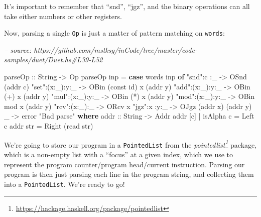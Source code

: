 \documentclass[]{article}
\newenvironment{Shaded}{}{}
\newcommand{\CommentTok}[1]{\textcolor[rgb]{0.38,0.63,0.69}{\textit{#1}}}
\newcommand{\DataTypeTok}[1]{\textcolor[rgb]{0.56,0.13,0.00}{#1}}
\newcommand{\FunctionTok}[1]{\textcolor[rgb]{0.02,0.16,0.49}{#1}}
\newcommand{\KeywordTok}[1]{\textcolor[rgb]{0.00,0.44,0.13}{\textbf{#1}}}
\newcommand{\NormalTok}[1]{#1}
\newcommand{\OtherTok}[1]{\textcolor[rgb]{0.00,0.44,0.13}{#1}}
\newcommand{\StringTok}[1]{\textcolor[rgb]{0.25,0.44,0.63}{#1}}
\renewcommand{\href}[2]{#2\footnote{\url{#1}}}
\begin{document}
It's important to remember that ``snd'', ``jgz'', and the binary operations can
all take either numbers or other registers.

Now, parsing a single \texttt{Op} is just a matter of pattern matching on
\texttt{words}:

\begin{Shaded}
\begin{Highlighting}[]
\CommentTok{-- source: https://github.com/mstksg/inCode/tree/master/code-samples/duet/Duet.hs#L39-L52}

\OtherTok{parseOp ::} \DataTypeTok{String} \OtherTok{->} \DataTypeTok{Op}
\NormalTok{parseOp inp }\FunctionTok{=} \KeywordTok{case}\NormalTok{ words inp }\KeywordTok{of}
    \StringTok{"snd"}\FunctionTok{:}\NormalTok{c    }\FunctionTok{:}\NormalTok{_   }\OtherTok{->} \DataTypeTok{OSnd}\NormalTok{ (addr c)}
    \StringTok{"set"}\FunctionTok{:}\NormalTok{(x}\FunctionTok{:}\NormalTok{_)}\FunctionTok{:}\NormalTok{y}\FunctionTok{:}\NormalTok{_ }\OtherTok{->} \DataTypeTok{OBin}\NormalTok{ (const id) x (addr y)}
    \StringTok{"add"}\FunctionTok{:}\NormalTok{(x}\FunctionTok{:}\NormalTok{_)}\FunctionTok{:}\NormalTok{y}\FunctionTok{:}\NormalTok{_ }\OtherTok{->} \DataTypeTok{OBin}\NormalTok{ (}\FunctionTok{+}\NormalTok{)        x (addr y)}
    \StringTok{"mul"}\FunctionTok{:}\NormalTok{(x}\FunctionTok{:}\NormalTok{_)}\FunctionTok{:}\NormalTok{y}\FunctionTok{:}\NormalTok{_ }\OtherTok{->} \DataTypeTok{OBin}\NormalTok{ (}\FunctionTok{*}\NormalTok{)        x (addr y)}
    \StringTok{"mod"}\FunctionTok{:}\NormalTok{(x}\FunctionTok{:}\NormalTok{_)}\FunctionTok{:}\NormalTok{y}\FunctionTok{:}\NormalTok{_ }\OtherTok{->} \DataTypeTok{OBin}\NormalTok{ mod        x (addr y)}
    \StringTok{"rcv"}\FunctionTok{:}\NormalTok{(x}\FunctionTok{:}\NormalTok{_)}\FunctionTok{:}\NormalTok{_   }\OtherTok{->} \DataTypeTok{ORcv}\NormalTok{ x}
    \StringTok{"jgz"}\FunctionTok{:}\NormalTok{x    }\FunctionTok{:}\NormalTok{y}\FunctionTok{:}\NormalTok{_ }\OtherTok{->} \DataTypeTok{OJgz}\NormalTok{ (addr x) (addr y)}
\NormalTok{    _               }\OtherTok{->}\NormalTok{ error }\StringTok{"Bad parse"}
  \KeywordTok{where}
\OtherTok{    addr ::} \DataTypeTok{String} \OtherTok{->} \DataTypeTok{Addr}
\NormalTok{    addr [c] }\FunctionTok{|}\NormalTok{ isAlpha c }\FunctionTok{=} \DataTypeTok{Left}\NormalTok{ c}
\NormalTok{    addr str }\FunctionTok{=} \DataTypeTok{Right}\NormalTok{ (read str)}
\end{Highlighting}
\end{Shaded}

We're going to store our program in a \texttt{PointedList} from the
\emph{\href{https://hackage.haskell.org/package/pointedlist}{pointedlist}}
package, which is a non-empty list with a ``focus'' at a given index, which we
use to represent the program counter/program head/current instruction. Parsing
our program is then just parsing each line in the program string, and collecting
them into a \texttt{PointedList}. We're ready to go!
\end{document}
